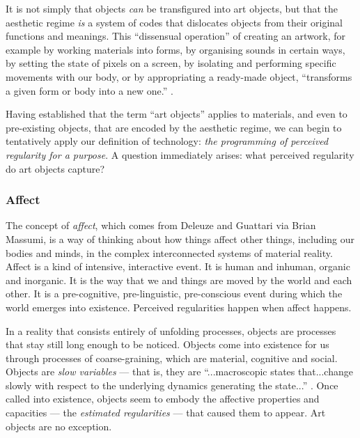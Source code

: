 \documentclass[letterpaper]{article}
\begin{document}
    It is not simply that objects \emph{can} be transfigured into art objects, but that the aesthetic regime \emph{is} a system of codes that dislocates objects from their original functions and meanings. This “dissensual operation” of creating an artwork, for example by working materials into forms, by organising sounds in certain ways, by setting the state of pixels on a screen, by isolating and performing specific movements with our body, or by appropriating a ready-made object, “transforms a given form or body into a new one.” \citep[p.54]{RancierThEmncptdSpcttr2009}.

    Having established that the term “art objects” applies to materials, and even to pre-existing objects, that are encoded by the aesthetic regime, we can begin to tentatively apply our definition of technology: \emph{the programming of perceived regularity for a purpose}. A question immediately arises: what perceived regularity do art objects capture?

    \subsubsection{Affect}

    The concept of \emph{affect}, which comes from Deleuze and Guattari via Brian Massumi, is a way of thinking about how things affect other things, including our bodies and minds, in the complex interconnected systems of material reality. Affect is a kind of intensive, interactive event. It is human and inhuman, organic and inorganic. It is the way that we and things are moved by the world and each other. It is a pre-cognitive, pre-linguistic, pre-conscious event during which the world emerges into existence. Perceived regularities happen when affect happens.
    
    In a reality that consists entirely of unfolding processes, objects are processes that stay still long enough to be noticed. Objects come into existence for us through processes of coarse-graining, which are material, cognitive and social. Objects are \emph{slow variables} — that is, they are “...macroscopic states that...change slowly with respect to the underlying dynamics generating the state...” \citep[p.61]{FlackEtAlTmsclsSymmtryUncrtnty2013}. Once called into existence, objects seem to embody the affective properties and capacities — the \emph{estimated regularities} \citep[p.9]{FlackCrsGrnng2017} — that caused them to appear. Art objects are no exception.
\end{document}

